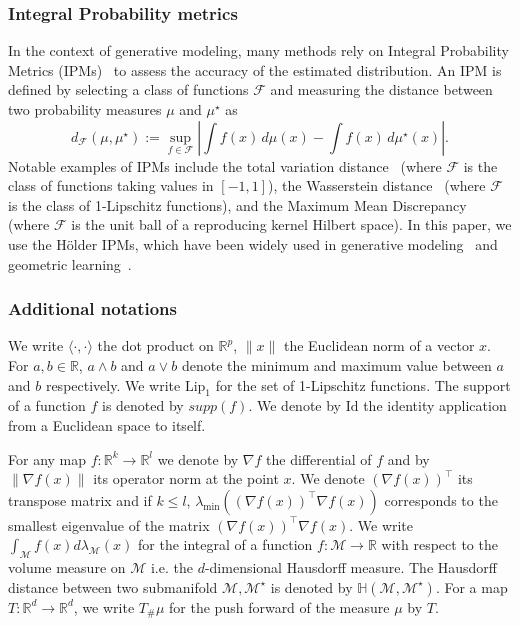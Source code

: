 \documentclass[10pt]{article}
\begin{document}
\subsubsection{Integral Probability metrics}
In the context of generative modeling, many methods rely on Integral Probability Metrics (IPMs)~\citep{IPMsMuller} to assess the accuracy of the estimated distribution.
 An IPM is defined by selecting a class of functions $\mathcal{F}$ and measuring the distance between two probability measures $\mu$ and $\mu^\star$ as
\begin{equation}\label{eq:genralIPM}
    d_{\mathcal{F}}(\mu,\mu^\star) := \sup_{f \in \mathcal{F}} \left| \int f(x)\, d\mu(x) - \int f(x)\, d\mu^\star(x) \right|.
\end{equation}
Notable examples of IPMs include the total variation distance~\citep{verdu2014total} (where $\mathcal{F}$ is the class of functions taking values in $[-1,1]$), the Wasserstein distance~\citep{villani2009optimal} (where $\mathcal{F}$ is the class of 1-Lipschitz functions), and the Maximum Mean Discrepancy~\citep{smola2006maximum} (where $\mathcal{F}$ is the unit ball of a reproducing kernel Hilbert space). In this paper, we use the Hölder IPMs, which have been widely used in generative modeling~\citep{arjovsky2017wasserstein, chakraborty2024statistical} and geometric learning~\citep{tang2023minimax}.

\subsubsection{Additional notations}
We write $\langle \cdot, \cdot \rangle$ the dot product on $\mathbb{R}^p$, $\|x\|$ the Euclidean norm of a vector $x$. For $a,b\in \mathbb{R}$, $a\wedge b$ and $a\vee b$ denote the minimum and maximum value between $a$ and $b$ respectively. We write $\text{Lip}_1$ for the set of 1-Lipschitz functions. The support of a function $f$ is denoted by $supp(f)$. We  denote by $\text{Id}$ the identity application from a Euclidean space to itself.

For any map $f:\mathbb{R}^k\rightarrow \mathbb{R}^l$ we denote by $\nabla f$ the differential of $f$ and by $\|\nabla f(x)\|$ its operator norm at the point $x$. We denote $(\nabla f(x))^\top$ its transpose matrix and if $k\leq l$, $\lambda_{\min}((\nabla f(x) )^\top \nabla f(x))$ corresponds to the smallest eigenvalue of the matrix $(\nabla f(x) )^\top \nabla f(x)$. We write $\int_{\mathcal{M}}f(x)d\lambda_{\mathcal{M}}(x)$ for the integral of a function $f:\mathcal{M}\rightarrow \mathbb{R}$ with respect to the volume measure on $\mathcal{M}$ i.e. the $d$-dimensional Hausdorff measure. The Hausdorff distance between two submanifold $\mathcal{M},\mathcal{M}^\star$ is denoted by $\mathbb{H}(\mathcal{M},\mathcal{M}^\star)$. For a map $T:\mathbb{R}^d\rightarrow \mathbb{R}^d$, we write $T_{\# }\mu$ for the push forward of the measure $\mu$ by $T$.
\end{document}
